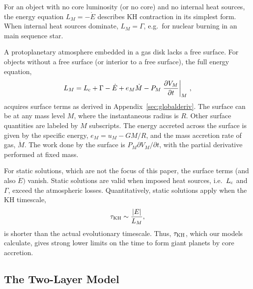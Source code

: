 \documentclass[apj, numberedappendix]{emulateapj}
\newcommand{\p}{\partial}
\newcommand{\Eq}[1]{Equation\,(\ref{#1})}
\newcommand{\App}[1]{Appendix~\ref{#1}}
\newcommand{\co}{_{\rm c}}
\begin{document}
For an object with no core luminosity (or no core) and no internal heat sources, the energy equation $L_M = -\dot{E}$ describes KH contraction in its simplest form.  When internal heat sources dominate, $L_M = \Gamma$, e.g.\ for nuclear burning in an main sequence star.

A protoplanetary atmosphere embedded in a gas disk lacks a free surface.  For objects without a free surface (or interior to a free surface), the full energy equation, 
\begin{equation}
\label{eq:coolingglobal}
L_M=L\co+\Gamma-\dot{E}+e_M \dot{M} - P_M \left. \frac{\partial V_M}{\partial t}\right|_M \, ,
\end{equation}
acquires surface terms as derived in  \App{sec:globalderiv}.  The surface can be at any mass level $M$, where the instantaneous radius is $R$.  Other surface quantities are labeled by $M$ subscripts.  The energy accreted across the surface is given by the specific energy, $e_M = u_M-G M/R$, and the mass accretion rate of gas, $\dot{M}$.  The work done by the surface is $P_M \partial V_M/ \partial t$, with the partial derivative performed at fixed mass.  %

For static solutions, which are not the focus of this paper, the surface terms (and also $\dot{E})$ vanish.  Static solutions are valid when imposed heat sources, i.e.\ $L\co$ and $\Gamma$, exceed the atmospheric losses.  Quantitatively, static solutions apply when the KH timescale,
\begin{equation}
\tau_{\rm KH} \sim {|E| \over L_M}, 
\end{equation} 
is shorter than the actual evolutionary timescale.  Thus, $\tau_{\rm KH}$, which our models calculate, gives strong lower limits on the time to form giant planets by core accretion.


\subsection{The Two-Layer Model} \label{sec:twolayer}
\end{document}
